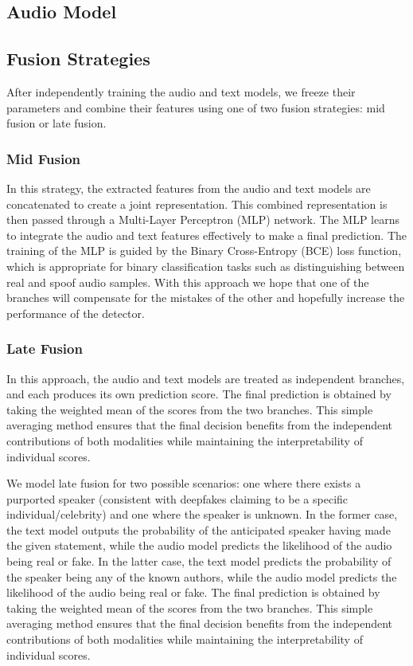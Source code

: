 \documentclass{Interspeech}
\begin{document}
\subsection{Audio Model}


% 

\subsection{Fusion Strategies}
After independently training the audio and text models, we freeze their
parameters and combine their features using one of two fusion strategies: mid
fusion or late fusion.

\subsubsection{Mid Fusion}
In this strategy, the extracted features from the audio and text models are
concatenated to create a joint representation. This combined representation is
then passed through a Multi-Layer Perceptron (MLP) network. The MLP learns to
integrate the audio and text features effectively to make a final prediction.
The training of the MLP is guided by the Binary Cross-Entropy (BCE) loss
function, which is appropriate for binary classification tasks such as
distinguishing between real and spoof audio samples. With this approach we hope
that one of the branches will compensate for the mistakes of the other and
hopefully increase the performance of the detector.

\subsubsection{Late Fusion}
In this approach, the audio and text models are treated as independent
branches, and each produces its own prediction score. The final prediction is
obtained by taking the weighted mean of the scores from the two branches. This
simple averaging method ensures that the final decision benefits from the
independent contributions of both modalities while maintaining the
interpretability of individual scores.


We model late fusion for two possible scenarios: one where there exists a
purported speaker (consistent with deepfakes claiming to be a specific
individual/celebrity) and one where the speaker is unknown. In the former case,
the text model outputs the probability of the anticipated speaker having made
the given statement, while the audio model predicts the likelihood of the audio
being real or fake. In the latter case, the text model predicts the probability
of the speaker being any of the known authors, while the audio model predicts
the likelihood of the audio being real or fake. The final prediction is
obtained by taking the weighted mean of the scores from the two branches. This
simple averaging method ensures that the final decision benefits from the
independent contributions of both modalities while maintaining the
interpretability of individual scores.
\end{document}

